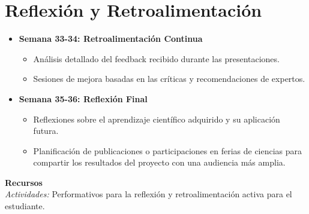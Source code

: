 \newpage
\section{Reflexión y Retroalimentación}
\begin{itemize}
  \item \textbf{Semana 33-34: Retroalimentación Continua}
  \begin{itemize}
    \item Análisis detallado del feedback recibido durante las presentaciones.
    \item Sesiones de mejora basadas en las críticas y recomendaciones de expertos.
  \end{itemize}
  \item \textbf{Semana 35-36: Reflexión Final}
  \begin{itemize}
    \item Reflexiones sobre el aprendizaje científico adquirido y su aplicación futura.
    \item Planificación de publicaciones o participaciones en ferias de ciencias para compartir los resultados del proyecto con una audiencia más amplia.
  \end{itemize}
\end{itemize}
{\large \textbf{Recursos}}\\
\textit{Actividades: } Performativos para la reflexión y retroalimentación activa para el estudiante.  
